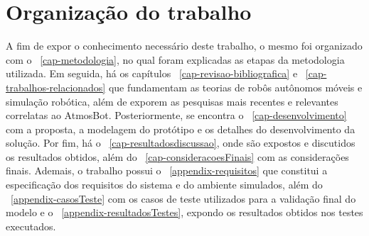\section{Organização do trabalho}
\label{sec-organizacao}

A fim de expor o conhecimento necessário deste trabalho, o mesmo foi organizado com o \chapterautorefname~\ref{cap-metodologia}, no qual foram explicadas as etapas da metodologia utilizada. Em seguida, há os capítulos \chapterautorefname~\ref{cap-revisao-bibliografica} e \chapterautorefname~\ref{cap-trabalhos-relacionados} que fundamentam as teorias de robôs autônomos móveis e simulação robótica, além de exporem as pesquisas mais recentes e relevantes correlatas ao AtmosBot.  Posteriormente, se encontra o \chapterautorefname~\ref{cap-desenvolvimento} com a proposta, a modelagem do protótipo e os detalhes do desenvolvimento da solução. Por fim, há o \chapterautorefname~\ref{cap-resultadosdiscussao}, onde são expostos e discutidos os resultados obtidos, além do \chapterautorefname~\ref{cap-consideracoesFinais} com as considerações finais.
Ademais, o trabalho possui o \appendixautorefname~\ref{appendix-requisitos} que constitui a especificação dos requisitos do sistema e do ambiente simulados, além do \appendixautorefname~\ref{appendix-casosTeste} com os casos de teste utilizados para a validação final do modelo e o \appendixautorefname~\ref{appendix-resultadosTestes}, expondo os resultados obtidos nos testes executados.
